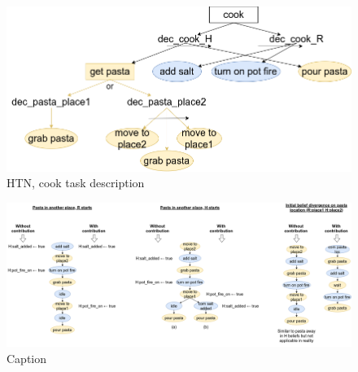 \documentclass[letterpaper]{article} %
\begin{document}
\begin{figure}
    \centering
    \includegraphics[width=\linewidth]{figures/htn.png}
    \caption{HTN, cook task description}
    \label{fig:htn}
\end{figure}

\begin{figure}
    \centering
    \includegraphics[width=\linewidth]{figures/example_cook.png}
    \caption{Caption}
    \label{fig:scenarios}
\end{figure}
\end{document}
